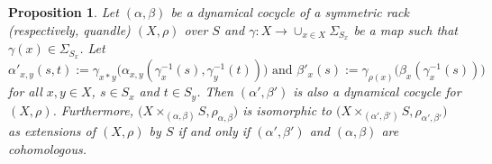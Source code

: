 \documentclass[11pt,reqno]{amsart}
\newtheorem{proposition}[theorem]{Proposition}
\theoremstyle{definition}
\numberwithin{equation}{subsection}
\begin{document}
\begin{proposition}\label{equivalence of dynamical extensions}
	Let $(\alpha,\beta)$ be a dynamical cocycle of a symmetric rack (respectively, quandle) $(X,\rho)$ over $S$ and $\gamma:X \rightarrow \cup_{x \in X}\Sigma_{S_x}$ be a map such that $\gamma(x) \in \Sigma_{S_x}$. Let
	\begin{equation*}
		\alpha'_{x,y}(s,t):= \gamma_{x*y}\big(\alpha_{x,y}(\gamma_x^{-1}(s),\gamma_y^{-1}(t))\big)
		\text{ and }
		\beta'_x(s):=\gamma_{\rho(x)}\big(\beta_x(\gamma_x^{-1}(s))\big)
	\end{equation*}
for all $x,y \in X$, $s\in S_x$ and $t \in S_y$. Then $(\alpha',\beta')$ is also a dynamical cocycle for $(X,\rho)$. Furthermore, 
$\big(X \times_{(\alpha,\beta)}S,\rho_{\alpha,\beta}\big)$ is isomorphic to $\big(X \times_{(\alpha',\beta')}S,\rho_{\alpha',\beta'}\big)$ as extensions of $(X,\rho)$ by $S$ if and only if $(\alpha',\beta')$ and $(\alpha, \beta)$ are cohomologous.
\end{proposition}
\end{document}
